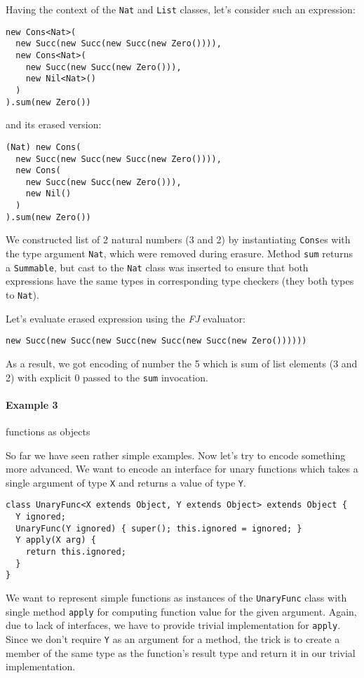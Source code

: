 \documentclass{article}[12pt]
\begin{document}
Having the context of the \texttt{Nat} and \texttt{List} classes,
let's consider such an expression:

\begin{verbatim}
new Cons<Nat>(
  new Succ(new Succ(new Succ(new Zero()))),
  new Cons<Nat>(
    new Succ(new Succ(new Zero())),
    new Nil<Nat>()
  )
).sum(new Zero())
\end{verbatim}
and its erased version:
\begin{verbatim}
(Nat) new Cons(
  new Succ(new Succ(new Succ(new Zero()))),
  new Cons(
    new Succ(new Succ(new Zero())),
    new Nil()
  )
).sum(new Zero())
\end{verbatim}
We constructed list of 2 natural numbers
(3 and 2) by instantiating \texttt{Cons}es with the type argument
\texttt{Nat}, which were removed during erasure. Method
\texttt{sum} returns a \texttt{Summable}, but cast to the
\texttt{Nat} class was inserted to ensure that both expressions have
the same types in corresponding type checkers (they both types
to \texttt{Nat}).

Let's evaluate erased expression using the \emph{FJ} evaluator:

\begin{verbatim}
new Succ(new Succ(new Succ(new Succ(new Succ(new Zero())))))
\end{verbatim}
As a result, we got encoding of number the 5 which is sum of list
elements (3 and 2) with explicit 0 passed to the \texttt{sum}
invocation.

\paragraph{Example 3} functions as objects

So far we have seen rather simple examples. Now let's try to
encode something more advanced.
We want to encode an interface for unary functions which takes
a single argument of type \texttt{X} and returns a value
of type \texttt{Y}.

\begin{verbatim}
class UnaryFunc<X extends Object, Y extends Object> extends Object {
  Y ignored;
  UnaryFunc(Y ignored) { super(); this.ignored = ignored; }
  Y apply(X arg) {
    return this.ignored;
  }
}
\end{verbatim}
We want to represent simple functions as instances of the
\texttt{UnaryFunc} class with single method \texttt{apply} for
computing function value for the given argument. Again, due to lack
of interfaces, we have to provide trivial implementation for
\texttt{apply}. Since we don't require \texttt{Y} as an argument
for a method, the trick is to create a member of the same type as
the function's result type and return it in our trivial implementation.
\end{document}
